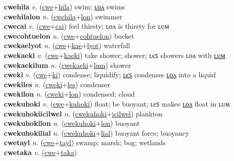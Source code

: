 \textbf{cwehila} \textit{v.} (\hyperref[cwe]{cwe}+\hyperref[hila]{hila})
swim; \hyperref[cwehilalon]{ʟᴏᴧ} swims \label{cwehila} \\
\textbf{cwehilalon} \textit{n.} (\hyperref[cwehila]{cwehila}+\hyperref[lon]{lon})
swimmer \label{cwehilalon} \\
\textbf{cwecai} \textit{v.} (\hyperref[cwe]{cwe}+\hyperref[cai]{cai})
feel thirsty; ʟᴏᴧ is thirsty for ʟᴜᴍ \label{cwecai} \\
\textbf{cwecohtuelon} \textit{n.} (\hyperref[cwe]{cwe}+\hyperref[cohtuelon]{cohtuelon})
bucket \label{cwecohtuelon} \\
\textbf{cwekaelyot} \textit{n.} (\hyperref[cwe]{cwe}+\hyperref[kae]{kae}+\hyperref[lyot]{lyot})
waterfall \label{cwekaelyot} \\
\textbf{cwekaeki} \textit{v.} (\hyperref[cwe]{cwe}+\hyperref[kaeki]{kaeki})
take shower; shower; ʟєꜱ showers ʟᴏᴧ with \hyperref[cwekaekilum]{ʟᴜᴍ} \label{cwekaeki} \\
\textbf{cwekaekilum} \textit{n.} (\hyperref[cwekaeki]{cwekaeki}+\hyperref[lum]{lum})
shower \label{cwekaekilum} \\
\textbf{cweki} \textit{v.} (\hyperref[cwe]{cwe}+\hyperref[ki]{ki})
condense; liquidify; \hyperref[cwekiles]{ʟєꜱ} condenses \hyperref[cwekilon]{ʟᴏᴧ} into a liquid \label{cweki} \\
\textbf{cwekiles} \textit{n.} (\hyperref[cweki]{cweki}+\hyperref[les]{les})
condenser \label{cwekiles} \\
\textbf{cwekilon} \textit{n.} (\hyperref[cweki]{cweki}+\hyperref[lon]{lon})
condensed; cloud \label{cwekilon} \\
\textbf{cwekuhoki} \textit{v.} (\hyperref[cwe]{cwe}+\hyperref[kuhoki]{kuhoki})
float; be buoyant; ʟєꜱ makes \hyperref[cwekuhokilon]{ʟᴏᴧ} float in ʟᴜᴍ \label{cwekuhoki} \\
\textbf{cwekuhokiicilwel} \textit{n.} (\hyperref[cwekuhoki]{cwekuhoki}+\hyperref[icilwel]{icilwel})
plankton \label{cwekuhokiicilwel} \\
\textbf{cwekuhokilon} \textit{n.} (\hyperref[cwekuhoki]{cwekuhoki}+\hyperref[lon]{lon})
buoyant \label{cwekuhokilon} \\
\textbf{cwekuhokilial} \textit{n.} (\hyperref[cwekuhoki]{cwekuhoki}+\hyperref[lial]{lial})
buoyant force; buoyancy \label{cwekuhokilial} \\
\textbf{cwetayl} \textit{n.} (\hyperref[cwe]{cwe}+\hyperref[tayl]{tayl})
swamp; marsh; bog; wetlands \label{cwetayl} \\
\textbf{cwetaka} \textit{v.} (\hyperref[cwe]{cwe}+\hyperref[taka]{taka})
